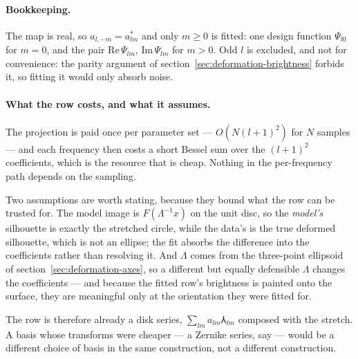 \paragraph{Bookkeeping.}  The map is real, so $a_{l,-m} = a_{lm}^*$ and only
$m \ge 0$ is fitted: one design function $\Psi_{l0}$ for $m = 0$, and the pair
$\mathrm{Re}\,\Psi_{lm}$, $\mathrm{Im}\,\Psi_{lm}$ for $m > 0$.  Odd $l$ is excluded, and not for
convenience: the parity argument of section~\ref{sec:deformation-brightness} forbids it, so fitting it
would only absorb noise.

\paragraph{What the row costs, and what it assumes.}  The projection is paid once per parameter
set --- $O(N(l+1)^2)$ for $N$ samples --- and each frequency then costs a short Bessel sum over
the $(l+1)^2$ coefficients, which is the resource that is cheap.  Nothing in the per-frequency
path depends on the sampling.

Two assumptions are worth stating, because they bound what the row can be trusted for.  The
model image is $F(\Lambda^{-1}x)$ on the unit disc, so the \emph{model's} silhouette is exactly
the stretched circle, while the data's is the true deformed silhouette, which is not an ellipse;
the fit absorbs the difference into the coefficients rather than resolving it.  And $\Lambda$ comes from the three-point ellipsoid of
section~\ref{sec:deformation-axes}, so a different but equally defensible $\Lambda$ changes the
coefficients --- and because the fitted row's brightness is painted onto the surface, they are
meaningful only at the orientation they were fitted for.

The row is therefore already a disk series, $\sum_{lm}a_{lm}\Yup_{lm}$ composed with the
stretch.  A basis whose transforms were cheaper --- a Zernike series, say --- would be a different
choice of basis in the same construction, not a different construction.

